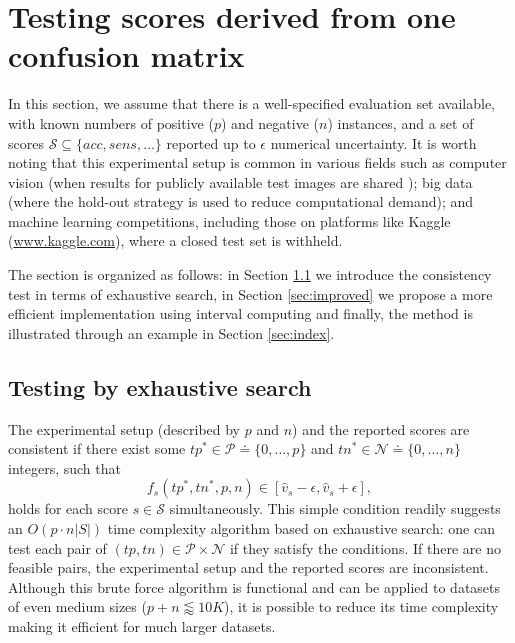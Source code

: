 \documentclass[5p, final]{elsarticle}
\begin{document}
\section{Testing scores derived from one confusion matrix}
\label{sec:ind}

In this section, we assume that there is a well-specified evaluation set available, with known numbers of positive ($p$) and negative ($n$) instances, and a set of scores $\mathcal{S}\subseteq\lbrace acc, sens, \dots\rbrace$ reported up to $\epsilon$ numerical uncertainty. 
It is worth noting that this experimental setup is common in various fields such as computer vision (when results for publicly available test images are shared \cite{vessel, isic2016}); big data (where the hold-out strategy is used to reduce computational demand); and machine learning competitions, including those on platforms like Kaggle (\url{www.kaggle.com}), where a closed test set is withheld.

The section is organized as follows: in Section \ref{sec:rommat} we introduce the consistency test in terms of exhaustive search, in Section \ref{sec:improved} we propose a more efficient implementation using interval computing and finally, the method is illustrated through an example in Section \ref{sec:index}.

\subsection{Testing by exhaustive search}
\label{sec:rommat}

The experimental setup (described by $p$ and $n$) and the reported scores are consistent if there exist some $tp^* \in \mathcal{P} \doteq \lbrace 0, \dots, p\rbrace$ and $tn^*\in\mathcal{N}\doteq \lbrace 0, \dots, n\rbrace$ integers, such that
\begin{equation}
\label{eqtest0}
f_s(tp^*, tn^*, p, n) \in [\hat{v}_s - \epsilon, \hat{v}_s + \epsilon],
\end{equation}
holds for each score $s\in\mathcal{S}$ simultaneously. This simple condition readily suggests an $O(p\cdot n\vert S\vert)$ time complexity algorithm based on exhaustive search: 
one can test each pair of $(tp, tn)\in \mathcal{P}\times\mathcal{N}$ if they satisfy the conditions. If there are no feasible pairs, the experimental setup and the reported scores are inconsistent. Although this brute force algorithm is functional and can be applied to datasets of even medium sizes ($p + n \lessapprox 10K$), it is possible to reduce its time complexity making it efficient for much larger datasets.
\end{document}
